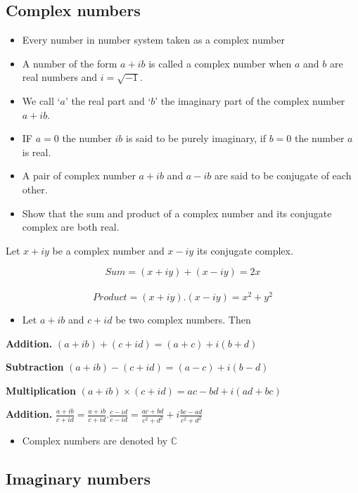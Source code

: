 \documentclass[]{book}
\providecommand{\tightlist}{%
  \setlength{\itemsep}{0pt}\setlength{\parskip}{0pt}}
\begin{document}
\hypertarget{complex-numbers}{%
\subsection{Complex numbers}\label{complex-numbers}}

\begin{itemize}
\tightlist
\item
  Every number in number system taken as a complex number
\item
  A number of the form \(a+ib\) is called a complex number when \(a\) and \(b\) are real numbers and \(i=\sqrt{-1}\).
\item
  We call `\(a\)' the real part and `\(b\)' the imaginary part of the complex number \(a+ib\).
\item
  IF \(a=0\) the number \(ib\) is said to be purely imaginary, if \(b=0\) the number \(a\) is real.
\item
  A pair of complex number \(a+ib\) and \(a-ib\) are said to be conjugate of each other.
\item
  Show that the sum and product of a complex number and its conjugate complex are both real.
\end{itemize}

Let \(x+iy\) be a complex number and \(x-iy\) its conjugate complex.

\[Sum = (x+iy)+(x-iy) = 2x\]\\
\[Product = (x+iy).(x-iy) = x^{2}+y^{2}\]

\begin{itemize}
\tightlist
\item
  Let \(a+ib\) and \(c+id\) be two complex numbers. Then
\end{itemize}

\textbf{Addition.} \((a+ib) + (c+id)= (a+c)+i(b+d)\)

\textbf{Subtraction} \((a+ib) - (c+id)= (a-c)+i(b-d)\)

\textbf{Multiplication} \((a+ib) \times (c+id)= ac-bd+i(ad+bc)\)

\textbf{Addition.} \(\frac{a+ib}{c+id}= \frac{a+ib}{c+id}.\frac{c-id}{c-id}= \frac{ac+bd}{c^2+d^2}+i\frac{bc-ad}{c^2+d^2}\)

\begin{itemize}
\tightlist
\item
  Complex numbers are denoted by \(\mathbb{C}\)
\end{itemize}

\hypertarget{imaginary-numbers}{%
\subsection{Imaginary numbers}\label{imaginary-numbers}}
\end{document}
